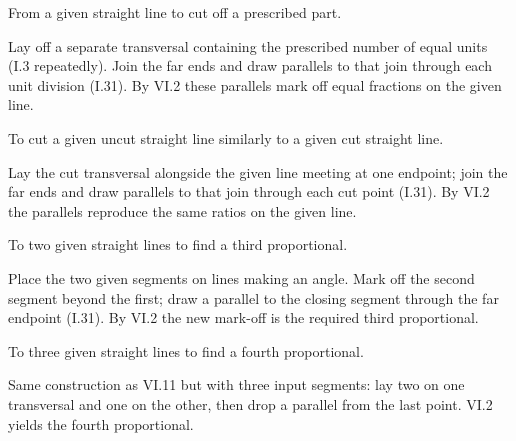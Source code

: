 \begin{claim}
\label{prop:VI.9}
From a given straight line to cut off a prescribed part.
\end{claim}
\begin{evidence}[Proof of VI.9]
\label{ev:VI.9}
Lay off a separate transversal containing the prescribed number of
equal units (I.3 repeatedly).  Join the far ends and draw parallels
to that join through each unit division (I.31).  By VI.2 these
parallels mark off equal fractions on the given line.
\end{evidence}

\begin{claim}
\label{prop:VI.10}
To cut a given uncut straight line similarly to a given cut straight
line.
\end{claim}
\begin{evidence}[Proof of VI.10]
\label{ev:VI.10}
Lay the cut transversal alongside the given line meeting at one
endpoint; join the far ends and draw parallels to that join through
each cut point (I.31).  By VI.2 the parallels reproduce the same
ratios on the given line.
\end{evidence}

\begin{claim}
\label{prop:VI.11}
To two given straight lines to find a third proportional.
\end{claim}
\begin{evidence}[Proof of VI.11]
\label{ev:VI.11}
Place the two given segments on lines making an angle.  Mark off the
second segment beyond the first; draw a parallel to the closing
segment through the far endpoint (I.31).  By VI.2 the new mark-off
is the required third proportional.
\end{evidence}

\begin{claim}
\label{prop:VI.12}
To three given straight lines to find a fourth proportional.
\end{claim}
\begin{evidence}[Proof of VI.12]
\label{ev:VI.12}
Same construction as VI.11 but with three input segments: lay two on
one transversal and one on the other, then drop a parallel from the
last point.  VI.2 yields the fourth proportional.
\end{evidence}

